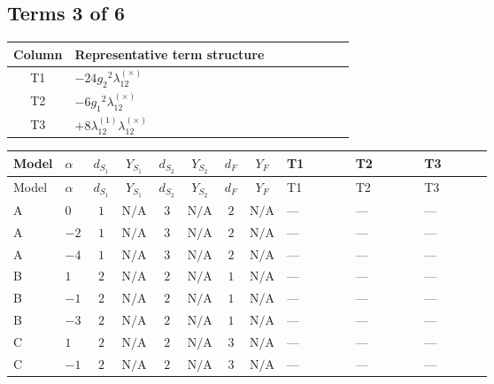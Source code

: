 \documentclass[8pt]{article}
\begin{document}
\begin{landscape}
\subsection*{Terms 3 of 6}
\begin{center}
\begin{tabular}{@{}c >{\raggedright\arraybackslash}p{0.82\linewidth}@{}}
\toprule
Column & Representative term structure \\
\midrule
T1 & \(\displaystyle -24 {g_2}^2 {\lambda_{12}^{(\times)}}\) \\
\midrule
T2 & \(\displaystyle -6 {g_1}^2 {\lambda_{12}^{(\times)}}\) \\
\midrule
T3 & \(\displaystyle +8 {\lambda_{12}^{(1)}} {\lambda_{12}^{(\times)}}\) \\
\midrule
\bottomrule
\end{tabular}
\end{center}
\smallskip
\tiny
\begin{longtable}{@{}llcccccc >{\raggedright\arraybackslash}p{0.21\linewidth} >{\raggedright\arraybackslash}p{0.21\linewidth} >{\raggedright\arraybackslash}p{0.21\linewidth}@{}}
\toprule
Model & $\alpha$ & $d_{S_1}$ & $Y_{S_1}$ & $d_{S_2}$ & $Y_{S_2}$ & $d_F$ & $Y_F$ & T1 & T2 & T3 \\
\midrule
\endfirsthead
\toprule
Model & $\alpha$ & $d_{S_1}$ & $Y_{S_1}$ & $d_{S_2}$ & $Y_{S_2}$ & $d_F$ & $Y_F$ & T1 & T2 & T3 \\
\midrule
\endhead
A & $0$ & $1$ & $\text{N/A}$ & $3$ & $\text{N/A}$ & $2$ & $\text{N/A}$ & --- & --- & --- \\
\midrule
A & $-2$ & $1$ & $\text{N/A}$ & $3$ & $\text{N/A}$ & $2$ & $\text{N/A}$ & --- & --- & --- \\
\midrule
A & $-4$ & $1$ & $\text{N/A}$ & $3$ & $\text{N/A}$ & $2$ & $\text{N/A}$ & --- & --- & --- \\
\midrule
B & $1$ & $2$ & $\text{N/A}$ & $2$ & $\text{N/A}$ & $1$ & $\text{N/A}$ & --- & --- & --- \\
\midrule
B & $-1$ & $2$ & $\text{N/A}$ & $2$ & $\text{N/A}$ & $1$ & $\text{N/A}$ & --- & --- & --- \\
\midrule
B & $-3$ & $2$ & $\text{N/A}$ & $2$ & $\text{N/A}$ & $1$ & $\text{N/A}$ & --- & --- & --- \\
\midrule
C & $1$ & $2$ & $\text{N/A}$ & $2$ & $\text{N/A}$ & $3$ & $\text{N/A}$ & --- & --- & --- \\
\midrule
C & $-1$ & $2$ & $\text{N/A}$ & $2$ & $\text{N/A}$ & $3$ & $\text{N/A}$ & --- & --- & --- \\

\end{longtable}
\end{landscape}
\end{document}

